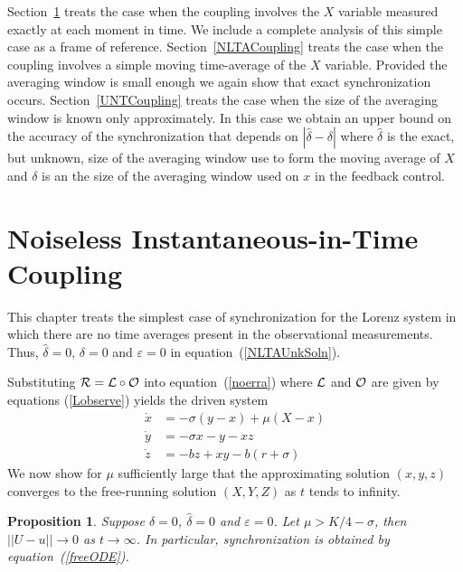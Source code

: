 \documentclass[master,tocprelim,12pt]{unrthesis}
\newtheorem{proposition}{Proposition}[chapter]
\theoremstyle{definition}
\numberwithin{equation}{chapter}
\begin{document}
\begin{manuscript}
Section~\ref{NLICoupling} treats the case 
when the coupling involves the $X$ variable measured 
exactly at each moment in time.
We include a complete analysis of this simple case as a frame
of reference.
Section~\ref{NLTACoupling} treats the case 
when the coupling involves a
simple moving time-average of the $X$ variable.
Provided the averaging window is small enough we again show
that exact synchronization occurs.
Section~\ref{UNTCoupling} treats the case when the size of the averaging
window is known only approximately.  In this case we obtain
an upper bound on the accuracy of the synchronization that
depends on $|\hat\delta-\delta|$ where $\hat\delta$ is the exact, but
unknown, size of the averaging window use to form the 
moving average of $X$ and $\delta$ is an the size of the
averaging window used on $x$ in the feedback control.

\section{Noiseless Instantaneous-in-Time Coupling}\label{NLICoupling}

This chapter treats the simplest case of synchronization for
the Lorenz system in which there are no time averages present
in the observational measurements.  Thus, $\hat\delta=0$, $\delta=0$
and $\varepsilon=0$ in equation~(\ref{NLTAUnkSoln}).

Substituting ${\cal R}={\cal L}\circ{\cal O}$ into equation~(\ref{noerra})
where ${\cal L}$ and ${\cal O}$ are given by equations (\ref{Lobserve})
yields the driven system
\begin{align}
\label{drivenX}
    \dot{x} &= -\sigma(y-x)+\mu(X-x)\\
\label{drivenY}
    \dot{y} &= -\sigma x-y-xz\\
\label{drivenZ}
    \dot{z} &= -bz+xy-b(r+\sigma)
\end{align}
We now show for $\mu$ sufficiently large
that
the approximating solution $(x,y,z)$
converges to the
free-running solution  $(X,Y,Z)$
as $t$ tends to infinity.
	
\begin{proposition}\label{NLIprop} 
Suppose $\delta=0$, $\hat\delta=0$ and $\varepsilon=0$.
Let $\mu>{K/4}-\sigma$, then 
$||U-u|| \to 0$ as $t\to \infty$.
In particular, synchronization is obtained 
by equation~(\ref{freeODE}).
\end{proposition}


\end{manuscript}
\end{document}
